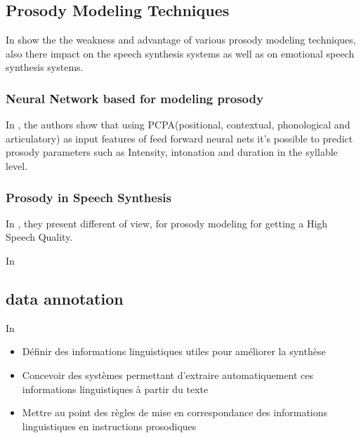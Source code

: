 \subsection{Prosody Modeling Techniques}
In \citep{key:article} show the the weakness and advantage of various prosody modeling techniques, also there impact on the speech synthesis systems as well as on emotional speech synthesis systems.
\subsubsection{Neural Network based  for modeling prosody}
In \citep{RamuReddy:2016:PMS:2839529.2839900}, the authors show that using PCPA(positional, contextual, phonological and articulatory) as input features of feed forward neural nets it's possible to predict  prosody parameters such as Intensity, intonation and duration in the syllable level.


\subsubsection{Prosody in Speech Synthesis}

In \citep{hirose2015speech}, they present different of view, for prosody modeling for getting a High Speech Quality.

In \citep{Rao:2012:PPT:2222511}

\subsection{data annotation}
In \citep{boeffard}

\begin{itemize}
\item Définir des informations linguistiques utiles pour améliorer la synthèse
\item Concevoir des systèmes permettant d’extraire automatiquement ces informations linguistiques à partir du texte
\item Mettre au point des règles de mise en correspondance des informations linguistiques en instructions prosodiques
\end{itemize}